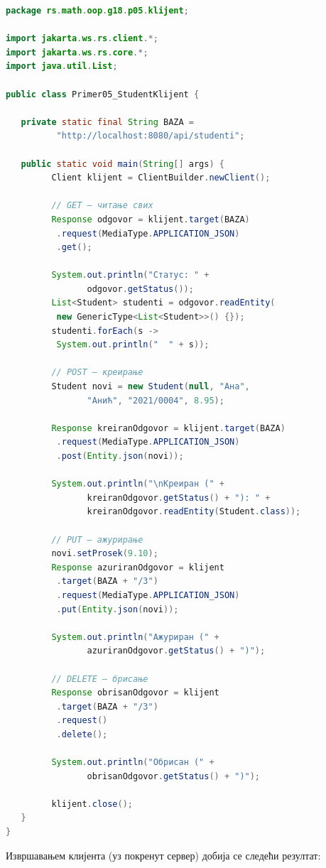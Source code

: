 \begin{lstlisting}[language=Java]
package rs.math.oop.g18.p05.klijent;
 
import jakarta.ws.rs.client.*;
import jakarta.ws.rs.core.*;
import java.util.List;
 
public class Primer05_StudentKlijent {
 
   private static final String BAZA =
          "http://localhost:8080/api/studenti";
 
   public static void main(String[] args) {
         Client klijent = ClientBuilder.newClient();
 
         // GET – читање свих
         Response odgovor = klijent.target(BAZA)
          .request(MediaType.APPLICATION_JSON)
          .get();
 
         System.out.println("Статус: " +
                odgovor.getStatus());
         List<Student> studenti = odgovor.readEntity(
          new GenericType<List<Student>>() {});
         studenti.forEach(s ->
          System.out.println("  " + s));
 
         // POST – креирање
         Student novi = new Student(null, "Ана",
                "Анић", "2021/0004", 8.95);
 
         Response kreiranOdgovor = klijent.target(BAZA)
          .request(MediaType.APPLICATION_JSON)
          .post(Entity.json(novi));
 
         System.out.println("\nКреиран (" +
                kreiranOdgovor.getStatus() + "): " +
                kreiranOdgovor.readEntity(Student.class));
 
         // PUT – ажурирање
         novi.setProsek(9.10);
         Response azuriranOdgovor = klijent
          .target(BAZA + "/3")
          .request(MediaType.APPLICATION_JSON)
          .put(Entity.json(novi));
 
         System.out.println("Ажуриран (" +
                azuriranOdgovor.getStatus() + ")");
 
         // DELETE – брисање
         Response obrisanOdgovor = klijent
          .target(BAZA + "/3")
          .request()
          .delete();
 
         System.out.println("Обрисан (" +
                obrisanOdgovor.getStatus() + ")");
 
         klijent.close();
   }
}
\end{lstlisting}


Извршавањем клијента (уз покренут сервер) добија се следећи резултат:


